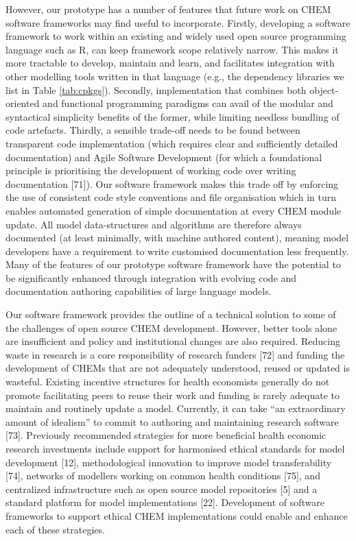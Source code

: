 \documentclass[
]{article}
\begin{document}
However, our prototype has a number of features that future work on CHEM software frameworks may find useful to incorporate. Firstly, developing a software framework to work within an existing and widely used open source programming language such as R, can keep framework scope relatively narrow. This makes it more tractable to develop, maintain and learn, and facilitates integration with other modelling tools written in that language (e.g., the dependency libraries we list in Table \ref{tab:cpkgs}). Secondly, implementation that combines both object-oriented and functional programming paradigms can avail of the modular and syntactical simplicity benefits of the former, while limiting needless bundling of code artefacts. Thirdly, a sensible trade-off needs to be found between transparent code implementation (which requires clear and sufficiently detailed documentation) and Agile Software Development (for which a foundational principle is prioritising the development of working code over writing documentation {[}71{]}). Our software framework makes this trade off by enforcing the use of consistent code style conventions and file organisation which in turn enables automated generation of simple documentation at every CHEM module update. All model data-structures and algorithms are therefore always documented (at least minimally, with machine authored content), meaning model developers have a requirement to write customised documentation less frequently. Many of the features of our prototype software framework have the potential to be significantly enhanced through integration with evolving code and documentation authoring capabilities of large language models.

Our software framework provides the outline of a technical solution to some of the challenges of open source CHEM development. However, better tools alone are insufficient and policy and institutional changes are also required. Reducing waste in research is a core responsibility of research funders {[}72{]} and funding the development of CHEMs that are not adequately understood, reused or updated is wasteful. Existing incentive structures for health economists generally do not promote facilitating peers to reuse their work and funding is rarely adequate to maintain and routinely update a model. Currently, it can take ``an extraordinary amount of idealism'' to commit to authoring and maintaining research software {[}73{]}. Previously recommended strategies for more beneficial health economic research investments include support for harmonised ethical standards for model development {[}12{]}, methodological innovation to improve model transferability {[}74{]}, networks of modellers working on common health conditions {[}75{]}, and centralized infrastructure such as open source model repositories {[}5{]} and a standard platform for model implementations {[}22{]}. Development of software frameworks to support ethical CHEM implementations could enable and enhance each of these strategies.
\end{document}

